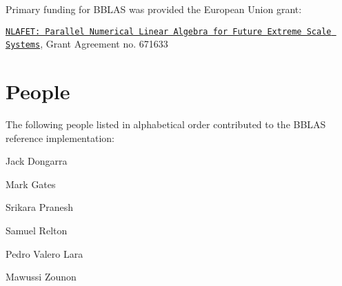 Primary funding for B\+B\+L\+AS was provided the European Union grant\+:


\begin{DoxyItemize}
\item \href{http://www.nlafet.eu}{\tt N\+L\+A\+F\+E\+T\+: Parallel Numerical Linear Algebra for Future Extreme Scale Systems}, Grant Agreement no. 671633
\end{DoxyItemize}

\section*{People }

The following people listed in alphabetical order contributed to the B\+B\+L\+AS reference implementation\+:


\begin{DoxyItemize}
\item Jack Dongarra
\item Mark Gates
\item Srikara Pranesh
\item Samuel Relton
\item Pedro Valero Lara
\item Mawussi Zounon 
\end{DoxyItemize}